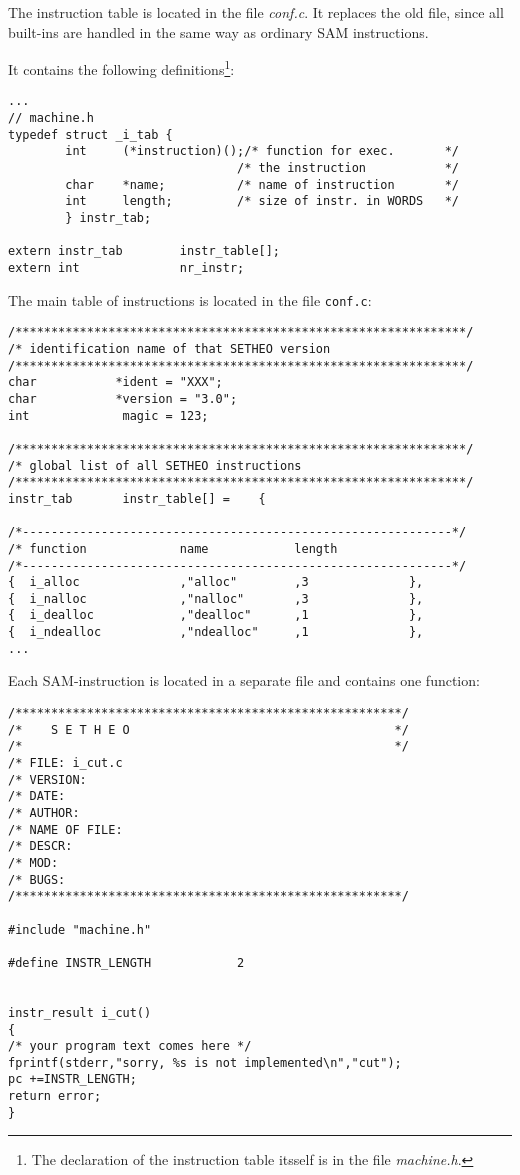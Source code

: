 The instruction table is located in the file {\em conf.c}.
It replaces the old file, since all built-ins are handled in the same way
as ordinary SAM instructions.

It contains the following definitions\footnote{The declaration of the instruction
table itsself is in the file {\em machine.h}.}:

\begin{verbatim}
...
// machine.h
typedef struct _i_tab {
        int     (*instruction)();/* function for exec.       */
                                /* the instruction           */
        char    *name;          /* name of instruction       */
        int     length;         /* size of instr. in WORDS   */
        } instr_tab;
 
extern instr_tab        instr_table[];
extern int              nr_instr;
\end{verbatim}

The main table of instructions is located in the file {\tt conf.c}:

\begin{verbatim}
/***************************************************************/
/* identification name of that SETHEO version
/***************************************************************/
char           *ident = "XXX";
char           *version = "3.0";
int             magic = 123;

/***************************************************************/
/* global list of all SETHEO instructions
/***************************************************************/
instr_tab       instr_table[] =    {

/*------------------------------------------------------------*/
/* function             name            length
/*------------------------------------------------------------*/
{  i_alloc              ,"alloc"        ,3              },
{  i_nalloc             ,"nalloc"       ,3              },
{  i_dealloc            ,"dealloc"      ,1              },
{  i_ndealloc           ,"ndealloc"     ,1              },
...
\end{verbatim}


Each SAM-instruction is located in a separate file and contains one
function:

\begin{verbatim}
/******************************************************/
/*    S E T H E O                                     */
/*                                                    */
/* FILE: i_cut.c
/* VERSION:
/* DATE:
/* AUTHOR:
/* NAME OF FILE:
/* DESCR:
/* MOD:
/* BUGS:
/******************************************************/

#include "machine.h"

#define INSTR_LENGTH            2


instr_result i_cut()
{
/* your program text comes here */
fprintf(stderr,"sorry, %s is not implemented\n","cut");
pc +=INSTR_LENGTH;
return error;
}
\end{verbatim}

